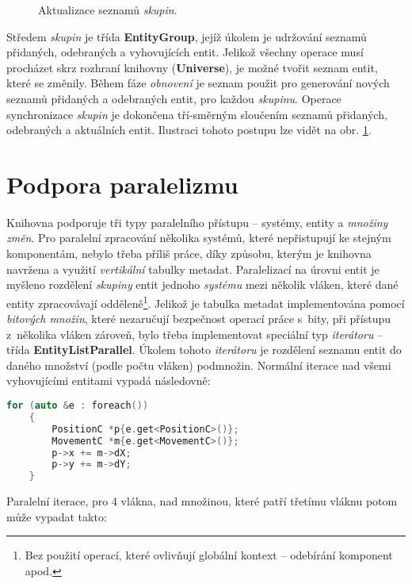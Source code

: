 \begin{figure}[H]
	\begin{center}
	\end{center}
	\caption{Aktualizace seznamů \emph{skupin}.}
	\label{Fig:IMPLMerge}
\end{figure}

Středem \emph{skupin} je třída \textbf{EntityGroup}, jejíž úkolem je udržování seznamů přidaných, odebraných a vyhovujících entit. Jelikož všechny operace musí procházet skrz rozhraní knihovny (\textbf{Universe}), je možné tvořit seznam entit, které se změnily. Během fáze \emph{obnovení} je seznam použit pro generování nových seznamů přidaných a odebraných entit, pro každou \emph{skupinu}. Operace synchronizace \emph{skupin} je dokončena tří-směrným sloučením seznamů přidaných, odebraných a aktuálních entit. Ilustraci tohoto postupu lze vidět na obr. \ref{Fig:IMPLMerge}.

\section{Podpora paralelizmu}

Knihovna podporuje tři typy paralelního přístupu -- systémy, entity a \emph{množiny změn}. Pro paralelní zpracování několika systémů, které nepřistupují ke stejným komponentám, nebylo třeba příliš práce, díky způsobu, kterým je knihovna navržena a využití \emph{vertikální} tabulky metadat. Paralelizací na úrovni entit je myšleno rozdělení \emph{skupiny} entit jednoho \emph{systému} mezi několik vláken, které dané entity zpracovávají odděleně\footnote{Bez použití operací, které ovlivňují globální kontext -- odebírání komponent apod.}. Jelikož je tabulka metadat implementována pomocí \emph{bitových množin}, které nezaručují bezpečnost operací práce s~bity, při přístupu z~několika vláken zároveň, bylo třeba implementovat speciální typ \emph{iterátoru} -- třída \textbf{EntityListParallel}. Úkolem tohoto \emph{iterátoru} je rozdělení seznamu entit do daného množství (podle počtu vláken) podmnožin. Normální iterace nad všemi vyhovujícími entitami vypadá následovně:

\begin{lstlisting}[language=C++]
	for (auto &e : foreach())
	{
	    PositionC *p{e.get<PositionC>()};
	    MovementC *m{e.get<MovementC>()};
	    p->x += m->dX;
	    p->y += m->dY;
	}
\end{lstlisting}

\noindent Paralelní iterace, pro 4 vlákna, nad množinou, které patří třetímu vláknu potom může vypadat takto:

